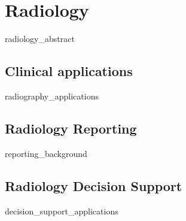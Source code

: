 \chapter{Radiology}
{radiology_abstract}
\clearpage


\section{Clinical applications}
{radiography_applications}
\clearpage

\section{Radiology Reporting}
{reporting_background}
\clearpage

\section{Radiology Decision Support}
{decision_support_applications}
\clearpage